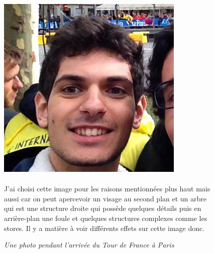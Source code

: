 \documentclass{article}
\begin{document}
\begin{figure}[!htb]
\centering
\begin{minipage}{0.5\textwidth}
\centering
\includegraphics[scale=0.5]{../Images/tdf.jpg}
\caption{\textit{Une photo pendant l'arrivée du Tour de France à Paris}}
\label{fig:tdf}
\end{minipage}%
\begin{minipage}{0.5\textwidth}
\paragraph*{} J'ai choisi cette image pour les raisons mentionnées plus haut mais aussi car on peut apercevoir un visage au second plan et un arbre qui est une structure droite qui possède quelques détails puis en arrière-plan une foule et quelques structures complexes comme les stores. Il y a matière à voir différents effets sur cette image donc. 
\end{minipage}
\end{figure}
\end{document}
